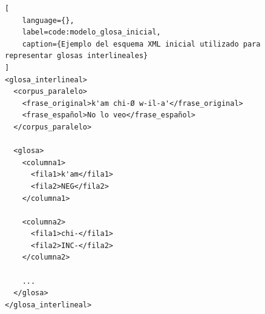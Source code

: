 \begin{lstlisting}[
    language={},
    label=code:modelo_glosa_inicial,
    caption={Ejemplo del esquema XML inicial utilizado para representar glosas interlineales}
]
<glosa_interlineal>
  <corpus_paralelo>
    <frase_original>k'am chi-Ø w-il-a'</frase_original>
    <frase_español>No lo veo</frase_español>
  </corpus_paralelo>

  <glosa>
    <columna1>
      <fila1>k'am</fila1>
      <fila2>NEG</fila2>
    </columna1>

    <columna2>
      <fila1>chi-</fila1>
      <fila2>INC-</fila2>
    </columna2>

    ...
  </glosa>
</glosa_interlineal>
\end{lstlisting}


































